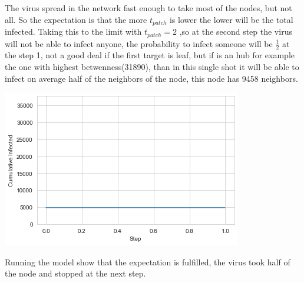 \documentclass[]{article}
\begin{document}
    The virus spread in the network fast enough to take most of the nodes, but not all. So the expectation is that the more $t_{patch}$ is lower the lower will be the total infected. Taking this to the limit with $t_{patch} = 2$ ,so at the second step the virus will not be able to infect anyone, the probability to infect someone will be $\frac{1}{2}$ at the step 1, not a good deal if the first target is leaf, but if is an hub for example the one with highest betwenness(31890), than in this single shot it will be able to infect on average half of the neighbors of the node, this node has 9458 neighbors.
    \begin{center}
        \includegraphics[scale=0.5]{charts/infection3.png}
    \end{center}
    Running the model show that the expectation is fulfilled, the virus took half of the node and stopped at the next step.
\end{document}

